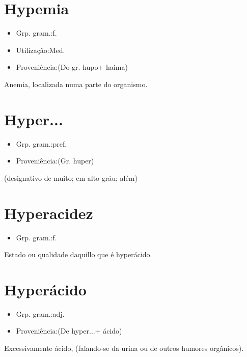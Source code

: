 \documentclass{article}
\begin{document}
\section{Hypemia}
\begin{itemize}
\item {Grp. gram.:f.}
\end{itemize}
\begin{itemize}
\item {Utilização:Med.}
\end{itemize}
\begin{itemize}
\item {Proveniência:(Do gr. \textunderscore hupo\textunderscore  + \textunderscore haima\textunderscore )}
\end{itemize}
Anemia, localizada numa parte do organismo.
\section{Hyper...}
\begin{itemize}
\item {Grp. gram.:pref.}
\end{itemize}
\begin{itemize}
\item {Proveniência:(Gr. \textunderscore huper\textunderscore )}
\end{itemize}
(designativo de \textunderscore muito\textunderscore ; \textunderscore em alto gráu\textunderscore ; \textunderscore além\textunderscore )
\section{Hyperacidez}
\begin{itemize}
\item {Grp. gram.:f.}
\end{itemize}
Estado ou qualidade daquillo que é hyperácido.
\section{Hyperácido}
\begin{itemize}
\item {Grp. gram.:adj.}
\end{itemize}
\begin{itemize}
\item {Proveniência:(De \textunderscore hyper...\textunderscore  + \textunderscore ácido\textunderscore )}
\end{itemize}
Excessivamente ácido, (falando-se da urina ou de outros humores orgânicos).
\end{document}
